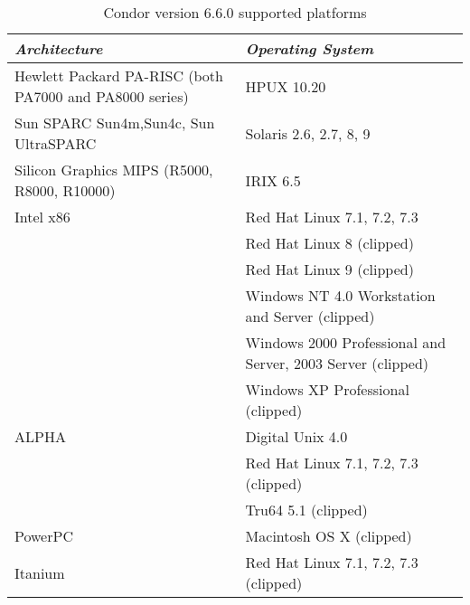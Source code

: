 \begin{center}
\begin{table}[hbt]
\begin{tabular}{|ll|} \hline
\emph{Architecture} & \emph{Operating System} \\ \hline \hline
Hewlett Packard PA-RISC (both PA7000 and PA8000 series) & HPUX 10.20 \\ \hline
Sun SPARC Sun4m,Sun4c, Sun UltraSPARC & Solaris 2.6, 2.7, 8, 9 \\ \hline
Silicon Graphics MIPS (R5000, R8000, R10000) & IRIX 6.5 \\ \hline
Intel x86 & Red Hat Linux 7.1, 7.2, 7.3 \\
 & Red Hat Linux 8 (clipped) \\ \hline
 & Red Hat Linux 9 (clipped) \\ \hline
 & Windows NT 4.0 Workstation and Server (clipped) \\ \hline
 & Windows 2000 Professional and Server, 2003 Server (clipped) \\ \hline
 & Windows XP Professional (clipped) \\ \hline
ALPHA & Digital Unix 4.0 \\
 & Red Hat Linux 7.1, 7.2, 7.3 (clipped) \\ \hline
 & Tru64 5.1 (clipped) \\ \hline
PowerPC & Macintosh OS X (clipped) \\
Itanium & Red Hat Linux 7.1, 7.2, 7.3 (clipped) \\
\end{tabular}
\caption{\label{6.6.0-supported-platforms}Condor version 6.6.0 supported platforms}
\end{table}
\end{center}


